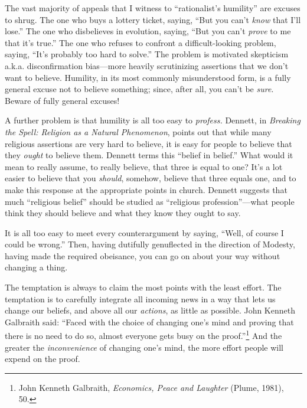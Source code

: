 {
 The vast majority of appeals that I witness to
``rationalist's
humility'' are excuses to shrug. The one who buys a
lottery ticket, saying, ``But you
can't \textit{know} that I'll
lose.'' The one who disbelieves in evolution, saying,
``But you can't \textit{prove} to me
that it's true.'' The one who refuses
to confront a difficult-looking problem, saying,
``It's probably too hard to
solve.'' The problem is motivated skepticism a.k.a.
disconfirmation bias---more heavily scrutinizing assertions that we
don't want to believe. Humility, in its most commonly
misunderstood form, is a fully general excuse not to believe something;
since, after all, you can't be \textit{sure}. Beware of
fully general excuses!}

{
 A further problem is that humility is all too easy to
\textit{profess.} Dennett, in \textit{Breaking the Spell: Religion as a
Natural Phenomenon}, points out that while many religious assertions
are very hard to believe, it is easy for people to believe that they
\textit{ought} to believe them. Dennett terms this
``belief in belief.'' What would it
mean to really assume, to really believe, that three is equal to one?
It's a lot easier to believe that you \textit{should},
somehow, believe that three equals one, and to make this response at
the appropriate points in church. Dennett suggests that much
``religious belief'' should be
studied as ``religious
profession''---what people think they should believe
and what they know they ought to say.}

{
 It is all too easy to meet every counterargument by saying,
``Well, of course I could be
wrong.'' Then, having dutifully genuflected in the
direction of Modesty, having made the required obeisance, you can go on
about your way without changing a thing.}

{
 The temptation is always to claim the most points with the least
effort. The temptation is to carefully integrate all incoming news in a
way that lets us change our beliefs, and above all our
\textit{actions}, as little as possible. John Kenneth Galbraith said:
``Faced with the choice of changing
one's mind and proving that there is no need to do so,
almost everyone gets busy on the
proof.''\footnote{John Kenneth Galbraith, \textit{Economics, Peace and Laughter}
(Plume, 1981), 50.} And the greater the
\textit{inconvenience} of changing one's mind, the more
effort people will expend on the proof.}

